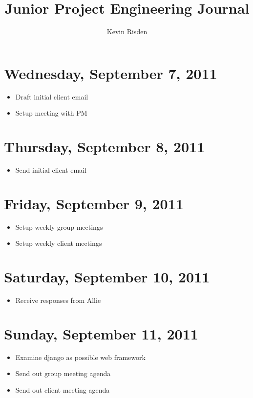 \documentclass{article}
\title{Junior Project Engineering Journal}
\author{Kevin Risden}
\begin{document}
\maketitle

\section{Wednesday, September 7, 2011}
\begin{itemize}
\item Draft initial client email
\item Setup meeting with PM
\end{itemize}

\section{Thursday, September 8, 2011}
\begin{itemize}
\item Send initial client email
\end{itemize}

\section{Friday, September 9, 2011}
\begin{itemize}
\item Setup weekly group meetings
\item Setup weekly client meetings
\end{itemize}

\section{Saturday, September 10, 2011}
\begin{itemize}
\item Receive responses from Allie
\end{itemize}

\section{Sunday, September 11, 2011}
\begin{itemize}
\item Examine django as possible web framework
\item Send out group meeting agenda
\item Send out client meeting agenda
\end{itemize}
\end{document}
